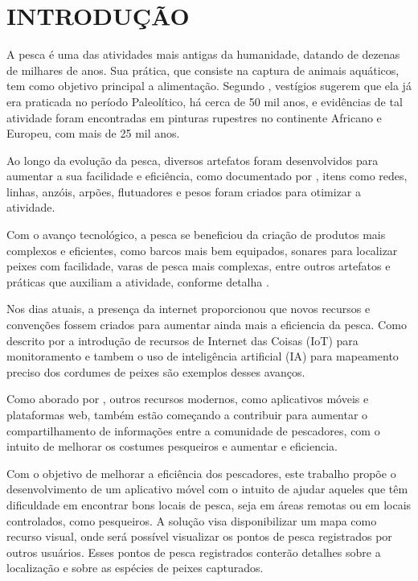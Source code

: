 
\chapter{INTRODUÇÃO}
\label{chap:introducao}

A pesca é uma das atividades mais antigas da humanidade, datando de dezenas de milhares de anos. Sua prática, que consiste na captura de animais aquáticos, tem como objetivo principal a alimentação. Segundo , vestígios sugerem que ela já era praticada no período Paleolítico, há cerca de 50 mil anos, e evidências de tal atividade foram encontradas em pinturas rupestres no continente Africano e Europeu, com mais de 25 mil anos.

Ao longo da evolução da pesca, diversos artefatos foram desenvolvidos para aumentar a sua facilidade e eficiência, como documentado por , itens como redes, linhas, anzóis, arpões, flutuadores e pesos foram criados para otimizar a atividade.

Com o avanço tecnológico, a pesca se beneficiou da criação de produtos mais complexos e eficientes, como barcos mais bem equipados, sonares para localizar peixes com facilidade, varas de pesca mais complexas, entre outros artefatos e práticas que auxiliam a atividade, conforme detalha .

Nos dias atuais, a presença da internet proporcionou que novos recursos e convenções fossem criados para aumentar ainda mais a eficiencia da pesca. Como descrito por  a introdução de recursos de Internet das Coisas (IoT) para monitoramento e tambem o uso de inteligência artificial (IA) para mapeamento preciso dos cordumes de peixes são exemplos desses avanços.

Como aborado por , outros recursos modernos, como aplicativos móveis e plataformas web, também estão começando a contribuir para aumentar o compartilhamento de informações entre a comunidade de pescadores, com o intuito de melhorar os costumes pesqueiros e aumentar e eficiencia.

Com o objetivo de melhorar a eficiência dos pescadores, este trabalho propõe o desenvolvimento de um aplicativo móvel com o intuito de ajudar aqueles que têm dificuldade em encontrar bons locais de pesca, seja em áreas remotas ou em locais controlados, como pesqueiros. A solução visa disponibilizar um mapa como recurso visual, onde será possível visualizar os pontos de pesca registrados por outros usuários. Esses pontos de pesca registrados conterão detalhes sobre a localização e sobre as espécies de peixes capturados.


